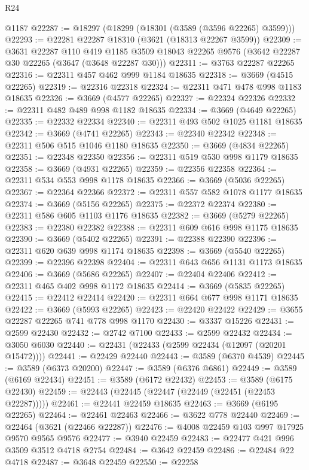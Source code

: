 \begin{lexlean}{R24}
\begin{coremodule}
    @1187
@22287 := @18297 (@18299 (@18301 (@3589 (@3596 @22265) @3599)))
@22293 := @22281 @22287 @18310 (@3621 (@18313 @22267 @3599))
@22309 := @3631
    @22287
    @110
    @419
    @1185
    @3509
    @18043
    @22265
    @9576
    (@3642 @22287 @30 @22265 (@3647 (@3648 @22287 @30)))
@22311 := @3763 @22287 @22265
@22316 := @22311 @457 @462 @999 @1184 @18635
@22318 := @3669 (@4515 @22265)
@22319 := @22316 @22318
@22324 := @22311 @471 @478 @998 @1183 @18635
@22326 := @3669 (@4577 @22265)
@22327 := @22324 @22326
@22332 := @22311 @482 @489 @998 @1182 @18635
@22334 := @3669 (@4649 @22265)
@22335 := @22332 @22334
@22340 := @22311 @493 @502 @1025 @1181 @18635
@22342 := @3669 (@4741 @22265)
@22343 := @22340 @22342
@22348 := @22311 @506 @515 @1046 @1180 @18635
@22350 := @3669 (@4834 @22265)
@22351 := @22348 @22350
@22356 := @22311 @519 @530 @998 @1179 @18635
@22358 := @3669 (@4931 @22265)
@22359 := @22356 @22358
@22364 := @22311 @534 @553 @998 @1178 @18635
@22366 := @3669 (@5036 @22265)
@22367 := @22364 @22366
@22372 := @22311 @557 @582 @1078 @1177 @18635
@22374 := @3669 (@5156 @22265)
@22375 := @22372 @22374
@22380 := @22311 @586 @605 @1103 @1176 @18635
@22382 := @3669 (@5279 @22265)
@22383 := @22380 @22382
@22388 := @22311 @609 @616 @998 @1175 @18635
@22390 := @3669 (@5402 @22265)
@22391 := @22388 @22390
@22396 := @22311 @620 @639 @998 @1174 @18635
@22398 := @3669 (@5540 @22265)
@22399 := @22396 @22398
@22404 := @22311 @643 @656 @1131 @1173 @18635
@22406 := @3669 (@5686 @22265)
@22407 := @22404 @22406
@22412 := @22311 @465 @402 @998 @1172 @18635
@22414 := @3669 (@5835 @22265)
@22415 := @22412 @22414
@22420 := @22311 @664 @677 @998 @1171 @18635
@22422 := @3669 (@5993 @22265)
@22423 := @22420 @22422
@22429 := @3655 @22287 @22265 @741 @778 @998 @1170
@22430 := @3337 @15226
@22431 := @2599 @22430
@22432 := @2742 @7100
@22433 := @2599 @22432
@22434 := @3050 @6030
@22440 := @22431 (@22433 (@2599 @22434 (@12097 (@20201 @15472))))
@22441 := @22429 @22440
@22443 := @3589 (@6370 @4539)
@22445 := @3589 (@6373 @20200)
@22447 := @3589 (@6376 @6861)
@22449 := @3589 (@6169 @22434)
@22451 := @3589 (@6172 @22432)
@22453 := @3589 (@6175 @22430)
@22459 := @22443 (@22445 (@22447 (@22449 (@22451 (@22453 @22287)))))
@22461 := @22441 @22459 @18635
@22463 := @3669 (@6195 @22265)
@22464 := @22461 @22463
@22466 := @3622 @778 @22440
@22469 := @22464 (@3621 (@22466 @22287))
@22476 := @4008 @22459 @103 @997 @17925 @9570 @9565 @9576
@22477 := @3940 @22459
@22483 := @22477 @421 @996 @3509 @3512 @4718 @2754
@22484 := @3642 @22459
@22486 := @22484 @22 @4718
@22487 := @3648 @22459
@22550 := @22258

\end{coremodule}
\end{lexlean}
